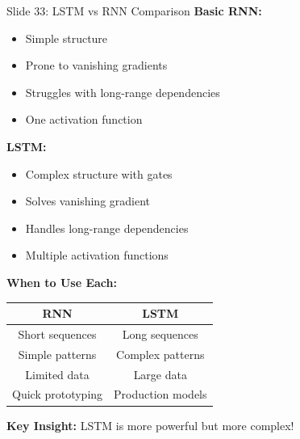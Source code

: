 \documentclass[8pt]{beamer}
\begin{document}
	\begin{frame}{Slide 33: LSTM vs RNN Comparison}
		\fontsize{6.5}{7.5}\selectfont
		\textbf{Basic RNN:}
		\begin{itemize}
			\item Simple structure
			\item Prone to vanishing gradients
			\item Struggles with long-range dependencies
			\item One activation function
		\end{itemize}
		
		\vspace{0.1cm}
		\textbf{LSTM:}
		\begin{itemize}
			\item Complex structure with gates
			\item Solves vanishing gradient
			\item Handles long-range dependencies
			\item Multiple activation functions
		\end{itemize}
		
		\vspace{0.1cm}
		\textbf{When to Use Each:}
		\begin{tabular}{|c|c|}
			\hline
			\textbf{RNN} & \textbf{LSTM} \\
			\hline
			Short sequences & Long sequences \\
			Simple patterns & Complex patterns \\
			Limited data & Large data \\
			Quick prototyping & Production models \\
			\hline
		\end{tabular}
		
		\textcolor{myblue}{\textbf{Key Insight:}} LSTM is more powerful but more complex!
	\end{frame}
	
\end{document}
